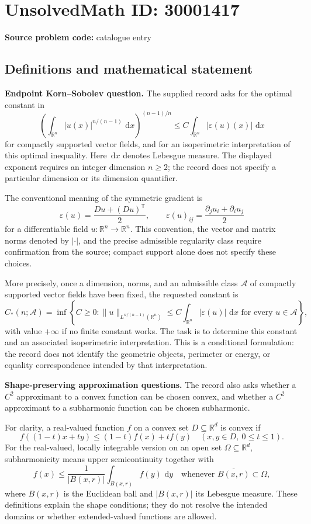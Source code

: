 \documentclass[11pt]{article}
\newcommand{\R}{\mathbb{R}}
\newcommand{\dd}{\,\mathrm{d}}
\begin{document}
\section*{UnsolvedMath ID: 30001417}
\textbf{Source problem code:} catalogue entry
\subsection{Definitions and mathematical statement}
\textbf{Endpoint Korn--Sobolev question.} The supplied record asks for the optimal constant in
\[
\left(\int_{\R^n}|u(x)|^{n/(n-1)}\,\dd x\right)^{(n-1)/n}
\leq C\int_{\R^n}|\varepsilon(u)(x)|\,\dd x
\]
for compactly supported vector fields, and for an isoperimetric interpretation of this optimal inequality. Here \(\dd x\) denotes Lebesgue measure. The displayed exponent requires an integer dimension \(n\geq2\); the record does not specify a particular dimension or its dimension quantifier.

The conventional meaning of the symmetric gradient is
\[
\varepsilon(u)=\frac{Du+(Du)^{\mathsf T}}2,
\qquad
\varepsilon(u)_{ij}=\frac{\partial_j u_i+\partial_i u_j}{2}
\]
for a differentiable field \(u:\R^n\to\R^n\). This convention, the vector and matrix norms denoted by \(|\cdot|\), and the precise admissible regularity class require confirmation from the source; compact support alone does not specify these choices.

More precisely, once a dimension, norms, and an admissible class \(\mathcal A\) of compactly supported vector fields have been fixed, the requested constant is
\[
C_*(n;\mathcal A)
=\inf\left\{C\geq0:
\|u\|_{L^{n/(n-1)}(\R^n)}
\leq C\int_{\R^n}|\varepsilon(u)|\,\dd x
\text{ for every }u\in\mathcal A\right\},
\]
with value \(+\infty\) if no finite constant works. The task is to determine this constant and an associated isoperimetric interpretation. This is a conditional formulation: the record does not identify the geometric objects, perimeter or energy, or equality correspondence intended by that interpretation.

\textbf{Shape-preserving approximation questions.} The record also asks whether a \(C^2\) approximant to a convex function can be chosen convex, and whether a \(C^2\) approximant to a subharmonic function can be chosen subharmonic.

For clarity, a real-valued function \(f\) on a convex set \(D\subseteq\R^d\) is convex if
\[
f((1-t)x+ty)\leq(1-t)f(x)+tf(y)
\quad(x,y\in D,\ 0\leq t\leq1).
\]
For the real-valued, locally integrable version on an open set \(\Omega\subseteq\R^d\), subharmonicity means upper semicontinuity together with
\[
f(x)\leq\frac{1}{|B(x,r)|}\int_{B(x,r)}f(y)\,\dd y
\quad\text{whenever }\overline{B(x,r)}\subset\Omega,
\]
where \(B(x,r)\) is the Euclidean ball and \(|B(x,r)|\) its Lebesgue measure. These definitions explain the shape conditions; they do not resolve the intended domains or whether extended-valued functions are allowed.
\end{document}
